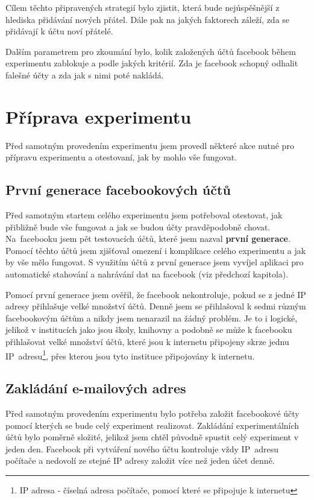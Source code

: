 \documentclass[thesis=M,czech]{FITthesis}[2013/05/10]
\begin{document}
Cílem těchto připravených strategií bylo zjistit, která bude nejúspěšnější z hlediska přidávání nových přátel. Dále pak na jakých faktorech záleží, zda se přidávají k účtu noví přátelé.

Dalším parametrem pro zkoumání bylo, kolik založených účtů facebook během experimentu zablokuje a podle jakých kritérií. Zda je facebook schopný odhalit falešné účty a zda jak s nimi poté nakládá.

\section{Příprava experimentu}

Před samotným provedením experimentu jsem provedl některé akce nutné pro přípravu experimentu a otestovaní, jak by mohlo vše fungovat.

\subsection{První generace facebookových účtů}

Před samotným startem celého experimentu jsem potřeboval otestovat, jak přibližně bude vše fungovat a jak se budou účty pravděpodobně chovat. Na~facebooku jsem pět testovacích účtů, které jsem nazval \textbf{první generace}. Pomocí těchto účtů jsem zjišťoval omezení i komplikace celého experimentu a jak by vše mělo fungovat. S využitím účtů z první generace jsem vyvíjel aplikaci pro automatické stahování a nahrávání dat na facebook (viz předchozí kapitola).

Pomocí první generace jsem ověřil, že facebook nekontroluje, pokud se z jedné IP adresy přihlašuje velké množství účtů. Denně jsem se přihlašoval k sedmi různým facebookovým účtům a nikdy jsem nenarazil na žádný problém. Je to i logické, jelikož v institucích jako jsou školy, knihovny a podobně se může k facebooku přihlašovat velké množství účtů, které jsou k internetu připojeny skrze jednu IP~adresu\footnote{IP adresa - číselná adresa počítače, pomocí které se připojuje k internetu}, přes kterou jsou tyto instituce připojovány k internetu.


\subsection{Zakládání e-mailových adres}

Před samotným provedením experimentu bylo potřeba založit facebookové účty pomocí kterých se bude celý experiment realizovat. Zakládání experimentálních účtů bylo poměrně složité, jelikož jsem chtěl původně spustit celý experiment v jeden den. Facebook při vytváření nového účtu kontroluje vždy IP~adresu počítače a nedovolí ze stejné IP adresy založit více než jeden účet denně. 
\end{document}
